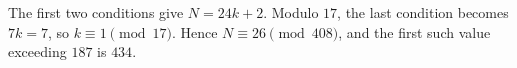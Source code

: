The first two conditions give $ N=24k+2 $. Modulo $ 17 $, the last condition becomes $ 7k=7 $, so $ k\equiv1\pmod{17}$. Hence $ N\equiv26\pmod{408}$, and the first such value exceeding $ 187 $ is $\boxed{434}$.
